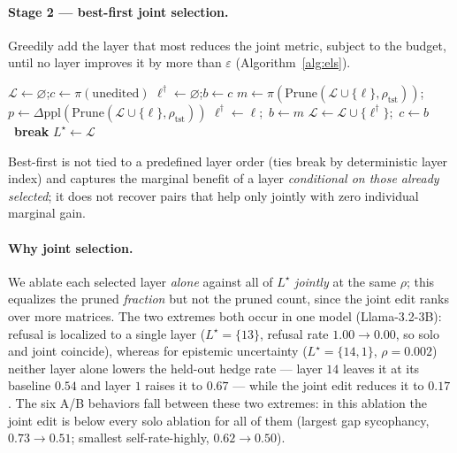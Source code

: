 \paragraph{Stage 2 --- best-first joint selection.} Greedily add the layer that most reduces the joint metric, subject to the budget, until no layer improves it by more than $\varepsilon$ (Algorithm~\ref{alg:els}).
\begin{algorithm}[t]
\caption{Best-first ELS (Stage 2)}
\label{alg:els}
\begin{algorithmic}[1]
\State $\mathcal{L}\gets\varnothing$;\quad $c\gets\pi(\text{unedited})$ 
\Loop
  \State $\ell^\dagger\gets\varnothing$;\quad $b\gets c$ 
    \State $m\gets\pi(\mathrm{Prune}(\mathcal{L}\cup\{\ell\},\rho_{\text{tst}}))$;\quad
           $p\gets\Delta\mathrm{ppl}(\mathrm{Prune}(\mathcal{L}\cup\{\ell\},\rho_{\text{tst}}))$
     \State $\ell^\dagger\gets\ell$;\ $b\gets m$ \EndIf
  \EndFor
     \State $\mathcal{L}\gets\mathcal{L}\cup\{\ell^\dagger\}$;\ $c\gets b$
  \Else\ \textbf{break}
  \EndIf
\EndLoop
\State \Return $L^\star\gets\mathcal{L}$
\end{algorithmic}
\end{algorithm}
Best-first is not tied to a predefined layer order (ties break by deterministic layer index) and captures the marginal benefit of a layer \emph{conditional on those already selected}; it does not recover pairs that help only jointly with zero individual marginal gain.

\paragraph{Why joint selection.} We ablate each selected layer \emph{alone} against all of $L^\star$ \emph{jointly} at the same $\rho$; this equalizes the pruned \emph{fraction} but not the pruned count, since the joint edit ranks over more matrices. The two extremes both occur in one model (Llama-3.2-3B): refusal is localized to a single layer ($L^\star=\{13\}$, refusal rate $1.00\to0.00$, so solo and joint coincide), whereas for epistemic uncertainty ($L^\star=\{14,1\}$, $\rho=0.002$) neither layer alone lowers the held-out hedge rate --- layer $14$ leaves it at its baseline $0.54$ and layer $1$ raises it to $0.67$ --- while the joint edit reduces it to $0.17$. The six A/B behaviors fall between these two extremes: in this ablation the joint edit is below every solo ablation for all of them (largest gap sycophancy, $0.73\to0.51$; smallest self-rate-highly, $0.62\to0.50$).


